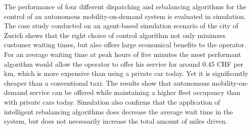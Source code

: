 The performance of four different dispatching and rebalancing algorithms for the
control of an autonomous mobility-on-demand system is evaluated in simulation.
The case study conducted on an agent-based simulation scenario of the city of Zurich
shows that the right choice of control algorithm not only minimzes customer waiting
times, but also offers large economical benefits to the operator. For an average
waiting time at peak hours of five minutes the most performant algorithm would allow
the operator to offer his service for around 0.45 CHF per km, which is more expensive
than using a private car today. Yet it is significantly cheaper than a conventional
taxi. The results show that autonomous mobility-on-demand service can be offered
while maintaining a higher fleet occupancy than with private cars today. Simulation
also confirms that the application of intelligent rebalancing algorithms does decrease
the average wait time in the system, but does not necessarily increase the total
amount of miles driven.

